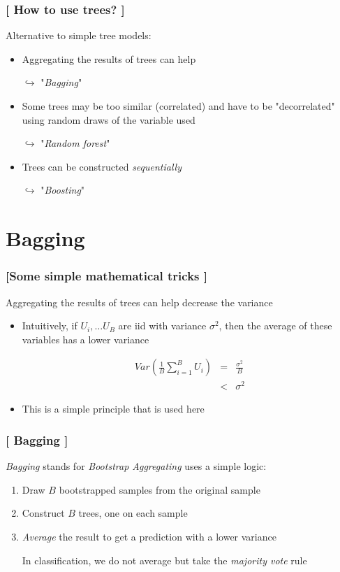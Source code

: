\documentclass[xcolor=x11names,compress, handhouts]{beamer}
\renewcommand{\(}{\begin{columns}}
\renewcommand{\)}{\end{columns}}
\newcommand{\<}[1]{\begin{column}{#1}}
\renewcommand{\>}{\end{column}}
\begin{document}
\begin{frame}
\frametitle{\textcolor{brique}{[ How to use trees? ]}}
Alternative to simple tree models:
\pause
\begin{itemize}[<+->]
    \item Aggregating the results of trees can help
    \item[$\hookrightarrow$]  "\emph{Bagging}"
    \item Some trees may be too similar (correlated) and have to be "decorrelated" using random draws of the variable used
    \item[$\hookrightarrow$]  "\emph{Random forest}"
    \item Trees can be constructed \textit{sequentially}
    \item[$\hookrightarrow$] "\emph{Boosting}"
\end{itemize}
\end{frame}



\section{Bagging}

\begin{frame}
\frametitle{\textcolor{brique}{[Some simple mathematical tricks ]}}
Aggregating the results of trees can help decrease the variance %
\pause
\begin{itemize}[<+->]
    \item  Intuitively, if $U_{i}, \ldots U_{B}$ are  iid with variance $\sigma^{2}$, then the average of these variables has a lower variance
    \item[]
\begin{eqnarray*}
Var \left( \frac{1}{B} \sum_{i=1}^{B} U_i \right) &=&  \frac{\sigma^{2}}{B} \\
            & < & \sigma^{2}
\end{eqnarray*}
    \item This is a simple principle that is used here
\end{itemize}
\end{frame}

\begin{frame}
\frametitle{\textcolor{brique}{[ Bagging ]}}
\textit{Bagging} stands for \textit{Bootstrap Aggregating} uses a simple logic:
\pause
\begin{enumerate}[<+->]
    \item Draw $B$ bootstrapped samples from the original sample
    \item Construct $B$ trees, one on each sample
    \item  \textit{Average} the result to get a prediction  with a lower variance
    \item[]
    \item[]In classification, we do not average but take the \emph{majority vote} rule
\end{enumerate}
\end{frame}
\end{document}
